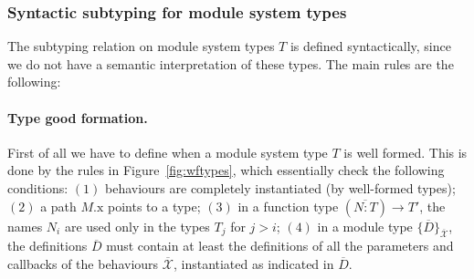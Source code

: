 \documentclass[a4paper,10pt]{article}
\newcommand{\tx}{\textrm{x}}
\newcommand{\BX}{\ensuremath{\mathcal{X}}}
\begin{document}
\subsubsection{Syntactic subtyping for module system types}
The subtyping relation on module system types $T$ is defined syntactically, since we do not have a semantic interpretation of these types. The main rules are the following:

\paragraph{Type good formation.} First of all we have to define when a module system type $T$ is well formed. This is done by the rules in Figure~\ref{fig:wftypes}, which essentially check the following conditions: $(1)$ behaviours are completely instantiated (by well-formed types); $(2)$ a path $M.\tx$ points to a type; $(3)$ in a function type $(\overline{N:T})\to T'$, the names $N_i$ are  used only in the types $T_j$ for $j>i$; $(4)$ in a module type $\{\overline{D}\}_{\overline{\BX}}$, the definitions $\overline{D}$ must contain at least the definitions of all the parameters and callbacks of the behaviours $\overline{\BX}$, instantiated as indicated in $\overline{D}$. 
\end{document}
